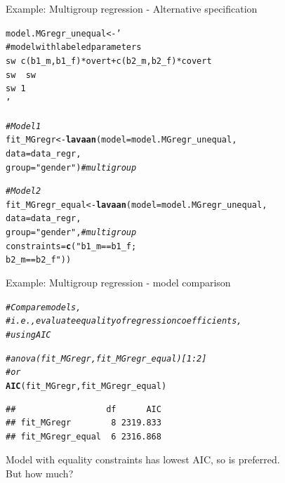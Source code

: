 \documentclass[10pt]{beamer}\usepackage[]{graphicx}\usepackage[]{xcolor}
\makeatletter
\newcommand{\hlstr}[1]{\textcolor[rgb]{0.192,0.494,0.8}{#1}}%
\newcommand{\hlcom}[1]{\textcolor[rgb]{0.678,0.584,0.686}{\textit{#1}}}%
\newcommand{\hlstd}[1]{\textcolor[rgb]{0.345,0.345,0.345}{#1}}%
\newcommand{\hlkwb}[1]{\textcolor[rgb]{0.69,0.353,0.396}{#1}}%
\newcommand{\hlkwc}[1]{\textcolor[rgb]{0.333,0.667,0.333}{#1}}%
\newcommand{\hlkwd}[1]{\textcolor[rgb]{0.737,0.353,0.396}{\textbf{#1}}}%
\newenvironment{kframe}{%
 \def\at@end@of@kframe{}%
 \ifinner\ifhmode%
  \def\at@end@of@kframe{\end{minipage}}%
  \begin{minipage}{\columnwidth}%
 \fi\fi%
 \def\FrameCommand##1{\hskip\@totalleftmargin \hskip-\fboxsep
 \colorbox{shadecolor}{##1}\hskip-\fboxsep
     \hskip-\linewidth \hskip-\@totalleftmargin \hskip\columnwidth}%
 \MakeFramed {\advance\hsize-\width
   \@totalleftmargin\z@ \linewidth\hsize
   \@setminipage}}%
 {\par\unskip\endMakeFramed%
 \at@end@of@kframe}
\newenvironment{knitrout}{}{} %
\makeatother
\begin{document}
%
\begin{frame}[fragile]{Example: Multigroup regression - Alternative specification}

\begin{knitrout}
\color{fgcolor}\begin{kframe}
\begin{alltt}
\hlstd{model.MGregr_unequal} \hlkwb{<-} \hlstr{'
  # model with labeled parameters
  sw ~ c(b1_m,b1_f)*overt + c(b2_m,b2_f)*covert 
  sw ~~ sw                                      
  sw ~ 1                                        
'}

\hlcom{# Model 1}
\hlstd{fit_MGregr} \hlkwb{<-} \hlkwd{lavaan}\hlstd{(}\hlkwc{model} \hlstd{= model.MGregr_unequal,}
                    \hlkwc{data} \hlstd{= data_regr,}
                    \hlkwc{group} \hlstd{=} \hlstr{"gender"}\hlstd{)} \hlcom{# multigroup}

\hlcom{# Model 2}
\hlstd{fit_MGregr_equal} \hlkwb{<-} \hlkwd{lavaan}\hlstd{(}\hlkwc{model} \hlstd{= model.MGregr_unequal,}
                    \hlkwc{data} \hlstd{= data_regr,}
                    \hlkwc{group} \hlstd{=} \hlstr{"gender"}\hlstd{,} \hlcom{# multigroup}
                    \hlkwc{constraints} \hlstd{=} \hlkwd{c}\hlstd{(}\hlstr{"b1_m == b1_f; 
                                    b2_m == b2_f"}\hlstd{))}
\end{alltt}
\end{kframe}
\end{knitrout}
          
\end{frame}
%
\begin{frame}[fragile]{Example: Multigroup regression - model comparison}

\begin{knitrout}
\color{fgcolor}\begin{kframe}
\begin{alltt}
\hlcom{# Compare models, }
\hlcom{# i.e., evaluate equality of regression coefficients,}
\hlcom{# using AIC}

\hlcom{#anova(fit_MGregr, fit_MGregr_equal)[1:2] }
\hlcom{# or}
\hlkwd{AIC}\hlstd{(fit_MGregr, fit_MGregr_equal)}
\end{alltt}
\begin{verbatim}
##                  df      AIC
## fit_MGregr        8 2319.833
## fit_MGregr_equal  6 2316.868
\end{verbatim}
\end{kframe}
\end{knitrout}

Model with equality constraints has lowest AIC, so is preferred.\\
But how much?

\end{frame}
\end{document}
